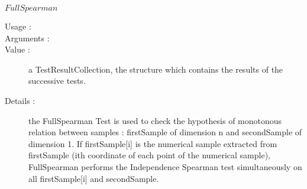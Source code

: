 \begin{description}
\begin{description}
  \item $FullSpearman$
    \begin{description}
    \item[Usage :] \rule{0pt}{1em}
    \item[Arguments :] \rule{0pt}{1em}
    \item[Value :]  a TestResultCollection, the structure which contains the results of the successive tests.
    \item[Details :] the FullSpearman Test is used to check the hypothesis of monotonous relation between samples : firstSample of dimension n and secondSample of dimension 1. If firstSample[i] is the numerical sample extracted from firstSample (ith coordinate of each point of the numerical sample), FullSpearman performs the Independence Spearman test simultaneously on all firstSample[i] and secondSample.
    \end{description}
    \bigskip


\end{description}
\end{description}
